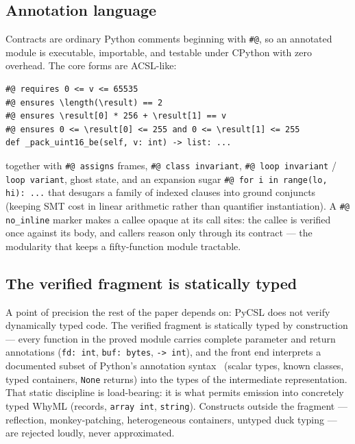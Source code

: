 \documentclass[11pt]{article}
\newcommand{\pycsl}{\textsf{PyCSL}}
\newcommand{\whyml}{\textsf{WhyML}}
\begin{document}
\subsection{Annotation language}

Contracts are ordinary Python comments beginning with \texttt{\#@}, so an
annotated module is executable, importable, and testable under CPython with
zero overhead. The core forms are ACSL-like:

\begin{lstlisting}
#@ requires 0 <= v <= 65535
#@ ensures \length(\result) == 2
#@ ensures \result[0] * 256 + \result[1] == v
#@ ensures 0 <= \result[0] <= 255 and 0 <= \result[1] <= 255
def _pack_uint16_be(self, v: int) -> list: ...
\end{lstlisting}

\noindent
together with \texttt{\#@ assigns} frames, \texttt{\#@ class invariant},
\texttt{\#@ loop invariant} / \texttt{loop variant}, ghost state, and an
expansion sugar \texttt{\#@ for i in range(lo, hi): ...} that desugars a
family of indexed clauses into ground conjuncts (keeping SMT cost in linear
arithmetic rather than quantifier instantiation). A \texttt{\#@ no\_inline}
marker makes a callee opaque at its call sites: the callee is verified once
against its body, and callers reason only through its contract --- the
modularity that keeps a fifty-function module tractable.

\subsection{The verified fragment is statically typed}\label{sec:typedfragment}

A point of precision the rest of the paper depends on: \pycsl{} does not
verify dynamically typed code. The verified fragment is statically typed by
construction --- every function in the proved module carries complete
parameter and return annotations (\texttt{fd: int}, \texttt{buf: bytes},
\texttt{-> int}), and the front end interprets a documented subset of
Python's annotation syntax~\cite{pep484} (scalar types, known classes,
typed containers, \texttt{None} returns) into the types of the intermediate
representation. That static discipline is load-bearing: it is what permits
emission into concretely typed \whyml{} (records, \texttt{array int},
\texttt{string}). Constructs outside the fragment --- reflection,
monkey-patching, heterogeneous containers, untyped duck typing --- are
rejected loudly, never approximated.
\end{document}
